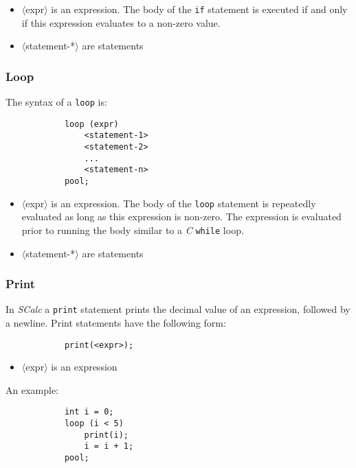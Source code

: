 \documentclass{article}
\newcommand{\code}[1]{\texttt{\textmd{#1}}}
\begin{document}
		\begin {itemize}
			\item{$\langle$expr$\rangle$} is an expression. The body of the \code{if} statement is executed if and only
			if this expression evaluates to a non-zero value.
			\item{$\langle$statement-*$\rangle$} are statements
		\end{itemize}
	
	
	\subsubsection{Loop}

		The syntax of a \code{loop} is:
		
		\begin{lstlisting}
			loop (expr)
				<statement-1>
				<statement-2>
				...
				<statement-n>
			pool;
		\end{lstlisting}

		\begin {itemize}
			\item{$\langle$expr$\rangle$} is an expression. The body of the \texttt{loop} statement is repeatedly evaluated as long as
			this expression is non-zero. The expression is evaluated prior to running the body similar to a \textit{C} \texttt{while} loop.
			\item{$\langle$statement-*$\rangle$} are statements
		\end{itemize}
	
	
	\subsubsection{Print}

		In \textit{SCalc} a \texttt{print} statement prints the decimal value of an expression, followed by a newline.
		Print statements have the following form:

		\begin{lstlisting}
			print(<expr>);
		\end{lstlisting}

		\begin{itemize}
			\item{$\langle$expr$\rangle$} is an expression
		\end{itemize}

		An example:

		\begin{lstlisting}
			int i = 0;
			loop (i < 5)
				print(i);
				i = i + 1;
			pool;
		\end{lstlisting}
\end{document}
